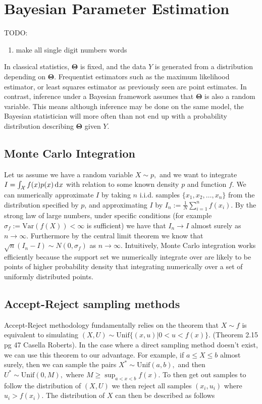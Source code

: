 \chapter{Bayesian Parameter Estimation}

TODO: \begin{enumerate}
    \item make all single digit numbers words
\end{enumerate}

In classical statistics, $\mathbf\Theta$ is fixed, and the data $Y$ is generated from a distribution depending on $\mathbf\Theta$. Frequentist estimators such as the maximum likelihood estimator, or least squares estimator as previously seen are point estimates. In contrast, inference under a Bayesian framework assumes that $\mathbf\Theta$ is also a random variable. This means although inference may be done on the same model, the Bayesian statistician will more often than not end up with a probability distribution describing $\mathbf\Theta$ given $Y$.

\color{red}
\section{Monte Carlo Integration}

Let us assume we have a random variable $X\sim p,$ and we want to integrate $I = \int_{\mathcal{X}} f(x)p(x)\diff x$ with relation to some known density $p$ and function $f$. We can numerically approximate $I$ by taking $n$ i.i.d. samples $\{x_1, x_2, \dots, x_n\}$ from the distribution specified by $p$, and approximating $I$ by $I_n:=\frac{1}{N}\sum_{i = 1}^nf(x_i).$ By the strong law of large numbers, under specific conditions (for example $\sigma_f := \mathrm{Var}(f(X))<\infty$ is sufficient) we have that $I_n \to I$ almost surely as $n\to\infty$. Furthermore by the central limit theorem we know that $\sqrt{n}(I_n - I) \sim N(0, \sigma_f)$ as $n\to\infty.$ Intuitively, Monte Carlo integration works efficiently because the support set we numerically integrate over are likely to be points of higher probability density that integrating numerically over a set of uniformly distributed points.

\color{black}
\section{Accept-Reject sampling methods}

Accept-Reject methodology fundamentally relies on the theorem that $X\sim f $ is equivalent to simulating $(X,U) \sim \mathrm{Unif}\{(x, u)|0<u<f(x)\}.$ (Theorem 2.15 pg 47 Casella Roberts). In the case where a direct sampling method doesn't exist, we can use this theorem to our advantage. For example, if $a \leq X \leq b$ almost surely, then we can sample the pairs $X^*\sim \mathrm{Unif}(a, b),$ and then $U^*\sim\mathrm{Unif}(0, M),$ where $M\geq \sup_{a<x<b} f(x).$ To then get out samples to follow the distribution of $(X, U)$ we then reject all samples $(x_i, u_i)$ where $u_i>f(x_i).$ The distribution of $X$ can then be described as follows

